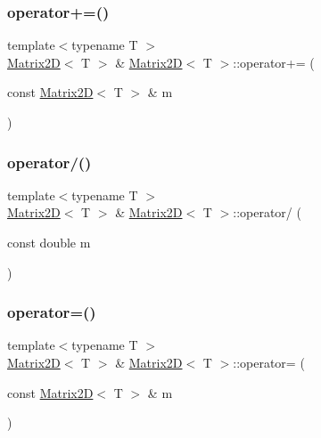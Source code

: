 \mbox{\label{classMatrix2D_a05b92232d9a5e7b76c4d4c1508ae2e12_a05b92232d9a5e7b76c4d4c1508ae2e12}} 
\subsubsection{\texorpdfstring{operator+=()}{operator+=()}}
{\footnotesize\ttfamily template$<$typename T $>$ \\
\mbox{\hyperlink{classMatrix2D}{Matrix2D}}$<$ T $>$ \& \mbox{\hyperlink{classMatrix2D}{Matrix2D}}$<$ T $>$\+::operator+= (\begin{DoxyParamCaption}\item[{const \mbox{\hyperlink{classMatrix2D}{Matrix2D}}$<$ T $>$ \&}]{m }\end{DoxyParamCaption})}

\mbox{\label{classMatrix2D_a48122f2fa79bf511d0c4e143dcdb0cf0_a48122f2fa79bf511d0c4e143dcdb0cf0}} 
\subsubsection{\texorpdfstring{operator/()}{operator/()}}
{\footnotesize\ttfamily template$<$typename T $>$ \\
\mbox{\hyperlink{classMatrix2D}{Matrix2D}}$<$ T $>$ \& \mbox{\hyperlink{classMatrix2D}{Matrix2D}}$<$ T $>$\+::operator/ (\begin{DoxyParamCaption}\item[{const double}]{m }\end{DoxyParamCaption})}

\mbox{\label{classMatrix2D_a17597829237784fa6089a23b7accb631_a17597829237784fa6089a23b7accb631}} 
\subsubsection{\texorpdfstring{operator=()}{operator=()}}
{\footnotesize\ttfamily template$<$typename T $>$ \\
\mbox{\hyperlink{classMatrix2D}{Matrix2D}}$<$ T $>$ \& \mbox{\hyperlink{classMatrix2D}{Matrix2D}}$<$ T $>$\+::operator= (\begin{DoxyParamCaption}\item[{const \mbox{\hyperlink{classMatrix2D}{Matrix2D}}$<$ T $>$ \&}]{m }\end{DoxyParamCaption})}

